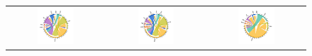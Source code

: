 \documentclass[a4paper]{article}
\begin{document}
\begin{figure}[h!]
{\begin{tabular}{ccc}
\includegraphics[width=0.4\textwidth, trim= {1.3cm 0.8cm 1.1cm 1cm}, clip]{"Figures/EM_MIG_AGR_2010_19_ROW.pdf"} & \includegraphics[width=0.4\textwidth, trim= {1.3cm 0.8cm 1.1cm 1cm}, clip]{"Figures/EM_MIG_FBE_2010_19_ROW.pdf"} &
\includegraphics[width=0.4\textwidth, trim= {1.3cm 0.8cm 1.1cm 1cm}, clip]{"Figures/EM_MIG_MAN_2010_19_ROW.pdf"} \\
\end{tabular}
}
\end{figure}
\FloatBarrier
\end{document}
